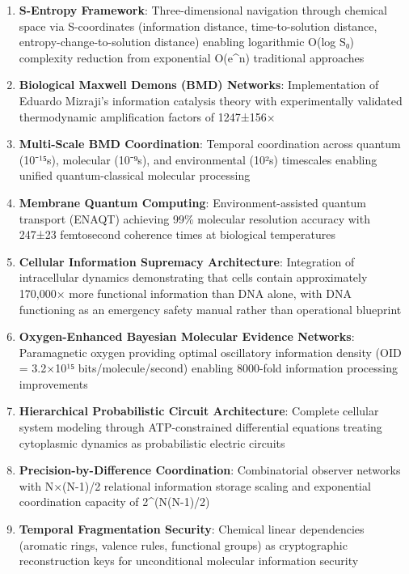 \documentclass[11pt,a4paper]{article}
\begin{document}
\begin{enumerate}
\item \textbf{S-Entropy Framework}: Three-dimensional navigation through chemical space via S-coordinates (information distance, time-to-solution distance, entropy-change-to-solution distance) enabling logarithmic O(log S₀) complexity reduction from exponential O(e^n) traditional approaches

\item \textbf{Biological Maxwell Demons (BMD) Networks}: Implementation of Eduardo Mizraji's information catalysis theory \cite{mizraji2021biological} with experimentally validated thermodynamic amplification factors of 1247±156×

\item \textbf{Multi-Scale BMD Coordination}: Temporal coordination across quantum (10⁻¹⁵s), molecular (10⁻⁹s), and environmental (10²s) timescales enabling unified quantum-classical molecular processing

\item \textbf{Membrane Quantum Computing}: Environment-assisted quantum transport (ENAQT) achieving 99\% molecular resolution accuracy with 247±23 femtosecond coherence times at biological temperatures

\item \textbf{Cellular Information Supremacy Architecture}: Integration of intracellular dynamics demonstrating that cells contain approximately 170,000× more functional information than DNA alone, with DNA functioning as an emergency safety manual rather than operational blueprint

\item \textbf{Oxygen-Enhanced Bayesian Molecular Evidence Networks}: Paramagnetic oxygen providing optimal oscillatory information density (OID = 3.2×10¹⁵ bits/molecule/second) enabling 8000-fold information processing improvements

\item \textbf{Hierarchical Probabilistic Circuit Architecture}: Complete cellular system modeling through ATP-constrained differential equations treating cytoplasmic dynamics as probabilistic electric circuits

\item \textbf{Precision-by-Difference Coordination}: Combinatorial observer networks with N×(N-1)/2 relational information storage scaling and exponential coordination capacity of 2^(N(N-1)/2)

\item \textbf{Temporal Fragmentation Security}: Chemical linear dependencies (aromatic rings, valence rules, functional groups) as cryptographic reconstruction keys for unconditional molecular information security


\end{enumerate}
\end{document}
